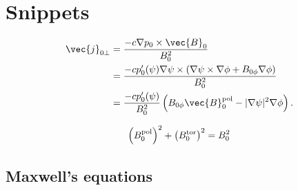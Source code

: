 \section{Snippets}

\begin{align}
  \vec{j}_{0 \perp} &= \frac{-c \nabla p_{0} \times \vec{B}_{0}}{B_{0}^{2}} \\
  &= \frac{-c p_{0}' (\psi) \nabla \psi \times (\nabla \psi \times \nabla \phi + B_{0 \phi} \nabla \phi)}{B_{0}^{2}} \nonumber \\
  &= \frac{-c p_{0}' (\psi)}{B_{0}^{2}} \left( B_{0 \phi} \vec{B}_{0}^{\pol} - \lvert \nabla \psi \rvert^{2} \nabla \phi \right).
\end{align}

\begin{gather}
  \left( B_{0}^{\textrm{pol}} \right)^{2} + \left( B_{0}^{\textrm{tor}} \right)^{2} = B_{0}^{2}
\end{gather}

\subsection{Maxwell's equations}

